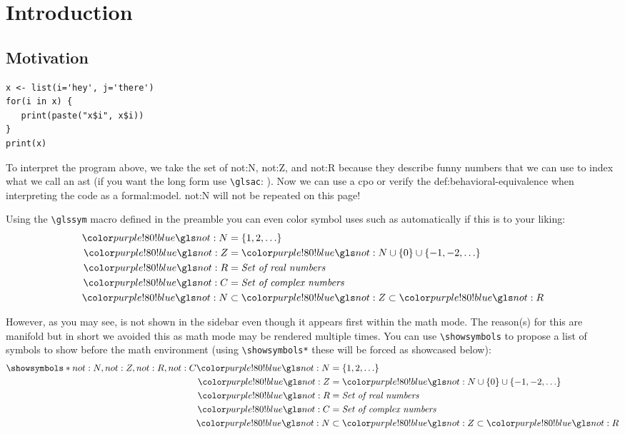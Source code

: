 \setchaptertoc
\chapter{Introduction}\label{chp:introduction}

\section{Motivation}

\begin{verbatim}
x <- list(i='hey', j='there')
for(i in x) {
   print(paste("x$i", x$i))
}
print(x)
\end{verbatim}


To interpret the program above, we take the set of \gls{not:N}, \gls{not:Z}, and \gls{not:R} because they describe funny numbers that we can use to index what we call an \gls{ast} (if you want the long form use \texttt{\textbackslash glsac}: ). Now we can use a \gls{cpo} or verify the \gls{def:behavioral-equivalence} when interpreting the code as a \gls{formal:model}.
\gls{not:N} will not be repeated on this page!

Using the \texttt{\textbackslash glssym} macro defined in the preamble you can even color symbol uses such as  automatically if this is to your liking:
\begin{align}
   \glssym{not:N} &= \{1, 2, \ldots\} \\
   \glssym{not:Z} &= \glssym{not:N} \cup \{0\} \cup \{-1, -2, \ldots\} \\
   \glssym{not:R} &= \textit{Set of real numbers} \\
   \glssym{not:C} &= \textit{Set of complex numbers} \\
   \glssym{not:N} &\subset \glssym{not:Z} \subset \glssym{not:R} %
\end{align}

However, as you may see,  is not shown in the sidebar even though it appears first within the math mode. The reason(s) for this are manifold but in short we avoided this as math mode may be rendered multiple times. 
You can use \texttt{\textbackslash showsymbols} to propose a list of symbols to show before the math environment (using \texttt{\textbackslash showsymbols*} these will be forced as showcased below):
\begin{align}
   \showsymbols*{not:N,not:Z,not:R,not:C}
   \glssym{not:N} &= \{1, 2, \ldots\} \\
   \glssym{not:Z} &= \glssym{not:N} \cup \{0\} \cup \{-1, -2, \ldots\} \\
   \glssym{not:R} &= \textit{Set of real numbers} \\
   \glssym{not:C} &= \textit{Set of complex numbers} \\
   \glssym{not:N} &\subset \glssym{not:Z} \subset \glssym{not:R} %
\end{align}

